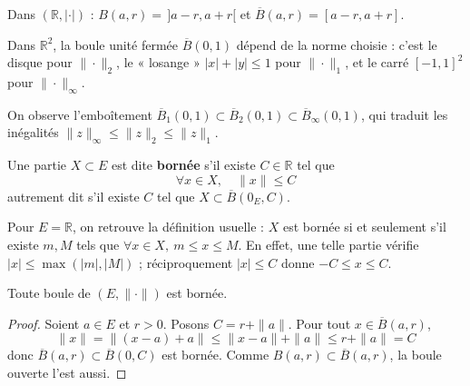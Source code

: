 \begin{exemple}
Dans $(\mathbb{R},|\cdot|)$ : $B(a,r)=\,]a-r,a+r[$ et $\overline{B}(a,r)=[a-r,a+r]$.

Dans $\mathbb{R}^2$, la boule unité fermée $\overline{B}(0,1)$ dépend de la norme choisie : c'est le disque pour $\|\cdot\|_2$, le « losange » $|x|+|y|\leq 1$ pour $\|\cdot\|_1$, et le carré $[-1,1]^2$ pour $\|\cdot\|_\infty$.
\begin{center}
\end{center}
On observe l'emboîtement $\overline{B}_1(0,1)\subset\overline{B}_2(0,1)\subset\overline{B}_\infty(0,1)$, qui traduit les inégalités $\|z\|_\infty\leq\|z\|_2\leq\|z\|_1$.
\end{exemple}

\begin{defi}
\label{defi:borne}
Une partie $X\subset E$ est dite \textbf{bornée} s'il existe $C\in\mathbb{R}$ tel que
\[\forall x\in X,\quad \|x\|\leq C\]
autrement dit s'il existe $C$ tel que $X\subset\overline{B}(0_E,C)$.
\end{defi}

\begin{remarque}
Pour $E=\mathbb{R}$, on retrouve la définition usuelle : $X$ est bornée si et seulement s'il existe $m,M$ tels que $\forall x\in X,\ m\leq x\leq M$. En effet, une telle partie vérifie $|x|\leq\max(|m|,|M|)$ ; réciproquement $|x|\leq C$ donne $-C\leq x\leq C$.
\end{remarque}

\begin{prop}
\label{prop:boule-bornee}
Toute boule de $(E,\|\cdot\|)$ est bornée.
\end{prop}

\begin{proof}
Soient $a\in E$ et $r>0$. Posons $C=r+\|a\|$. Pour tout $x\in\overline{B}(a,r)$,
\[\|x\| = \|(x-a)+a\| \leq \|x-a\|+\|a\| \leq r+\|a\| = C\]
donc $\overline{B}(a,r)\subset\overline{B}(0,C)$ est bornée. Comme $B(a,r)\subset\overline{B}(a,r)$, la boule ouverte l'est aussi.
\end{proof}

